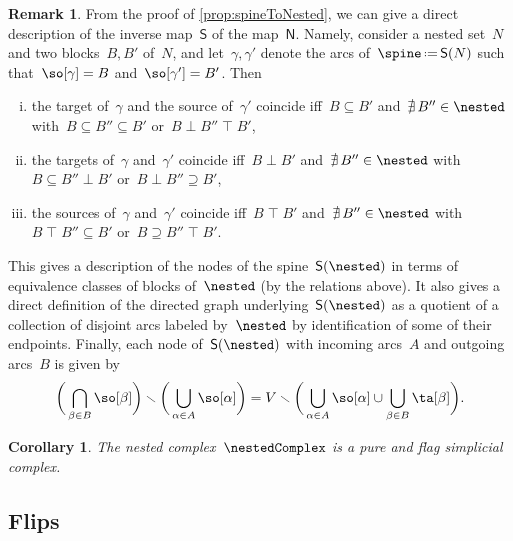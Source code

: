 \documentclass{amsart}
\newtheorem{corollary}[theorem]{Corollary}
\theoremstyle{definition}
\newtheorem{remark}[theorem]{Remark}
\newcommand{\ssm}{\smallsetminus} %
\newcommand{\eqdef}{\mbox{\,\raisebox{0.2ex}{\scriptsize\ensuremath{\mathrm:}}\ensuremath{=}\,}} %
\newcommand{\vertexSet}{V}
\newcommand{\negDisjoint}{\perp} %
\newcommand{\posDisjoint}{\;\top\;} %
\newcommand{\spineToNested}{\mathsf{N}} %
\newcommand{\nestedToSpine}{\mathsf{S}} %
\begin{document}
\begin{remark}
  \label{rem:nestedToSpine}
  From the proof of \cref{prop:spineToNested}, we can give a direct description of the inverse map~$\nestedToSpine$ of the map~$\spineToNested$.
  Namely, consider a nested set~$N$ and two blocks~$B, B'$ of~$N$, and let~$\gamma, \gamma'$ denote the arcs of~$\spine \eqdef \nestedToSpine(N)$ such that~$\so[\gamma] = B$ and~$\so[\gamma'] = B'$.
  Then
  \begin{enumerate}[(i)]
    \item the target of~$\gamma$ and the source of~$\gamma'$ coincide iff~$B \subseteq B'$ and~$\nexists \, B'' \in \nested$ with~$B \subseteq B'' \subseteq B'$ or~$B \negDisjoint B'' \posDisjoint B'$,
    \item the targets of~$\gamma$ and~$\gamma'$ coincide iff~$B \negDisjoint B'$ and~$\nexists \, B'' \in \nested$ with~$B \subseteq B'' \negDisjoint B'$ or~${B \negDisjoint B'' \supseteq B'}$,
\item the sources of~$\gamma$ and~$\gamma'$ coincide iff~$B \posDisjoint B'$ and~$\nexists \, B'' \in \nested$ with~$B \posDisjoint B'' \subseteq B'$ or~${B \supseteq B'' \posDisjoint B'}$.
\end{enumerate}
This gives a description of the nodes of the spine~$\nestedToSpine(\nested)$ in terms of equivalence classes of blocks of~$\nested$ (by the relations above). It also gives a direct definition of the directed graph underlying~$\nestedToSpine(\nested)$ as a quotient of a collection of disjoint arcs labeled by~$\nested$ by identification of some of their endpoints. Finally, each node of~$\nestedToSpine(\nested)$ with incoming arcs~$A$ and outgoing arcs~$B$ is given by
\[
\bigg( \bigcap_{\beta \in B} \so[\beta] \bigg) \ssm \bigg( \bigcup_{\alpha \in A} \so[\alpha] \bigg) = \vertexSet \ssm \bigg( \bigcup_{\alpha \in A} \so[\alpha] \cup \bigcup_{\beta \in B} \ta[\beta] \bigg).
\]
\end{remark}

\begin{corollary}
  The nested complex~$\nestedComplex$ is a pure and flag simplicial complex.
\end{corollary}


\subsection{Flips}
\end{document}
